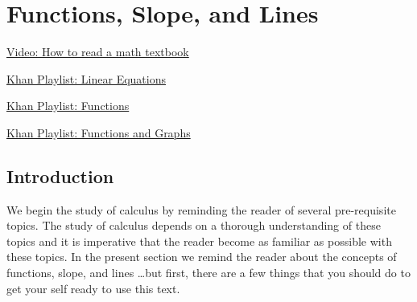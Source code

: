 \section{Functions, Slope, and Lines} \label{S:0.1.Functions}


\vspace*{-14 pt}

\begin{web}
\item
    \href{https://www.youtube.com/watch?v=AfoNnJ038zA&list=PL9bIjQJDwfGuXQHuS5Jkmum_CFILoCZX-&index=92}{Video:
    How to read a math textbook}
\item
    \href{https://www.khanacademy.org/math/algebra/solving-linear-equations-and-inequalities}{Khan
    Playlist: Linear Equations}
\item \href{https://www.khanacademy.org/math/algebra/algebra-functions}{Khan Playlist:
    Functions}
\item \href{https://www.khanacademy.org/math/algebra2/functions_and_graphs}{Khan Playlist:
    Functions and Graphs}
\end{web}

\nin \hrulefill



\subsection*{Introduction}
We begin the study of calculus by reminding the reader of several pre-requisite topics.
The study of calculus depends on a thorough understanding of these topics and it is
imperative that the reader become as familiar as possible with these topics.  In the
present section we remind the reader about the concepts of functions, slope, and lines
\dots but first, there are a few things that you should do to get your self ready to use
this text.



